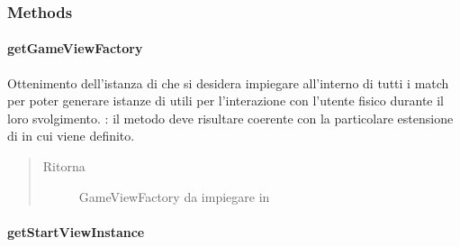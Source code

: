 \documentclass[letterpaper,10pt,italian,openany,oneside]{sphinxmanual}
\begin{document}
\begin{fulllineitems}
\label{\detokenize{source/it/unicam/cs/pa/mastermind/gamecore/MainManager:it.unicam.cs.pa.mastermind.gamecore.MainManager.MainManager()}}
\end{fulllineitems}



\subsubsection{Methods}
\label{\detokenize{source/it/unicam/cs/pa/mastermind/gamecore/MainManager:methods}}

\paragraph{getGameViewFactory}
\label{\detokenize{source/it/unicam/cs/pa/mastermind/gamecore/MainManager:getgameviewfactory}}

\begin{fulllineitems}
\label{\detokenize{source/it/unicam/cs/pa/mastermind/gamecore/MainManager:it.unicam.cs.pa.mastermind.gamecore.MainManager.getGameViewFactory()}}
Ottenimento dell’istanza di  che si desidera impiegare all’interno di tutti i match per poter generare istanze di  utili per l’interazione con l’utente fisico durante il loro svolgimento. : il metodo deve risultare coerente con la particolare estensione di  in cui viene definito.
\begin{quote}\begin{description}
\item[{Ritorna}] \leavevmode
GameViewFactory da impiegare in 

\end{description}\end{quote}

\end{fulllineitems}



\paragraph{getStartViewInstance}
\label{\detokenize{source/it/unicam/cs/pa/mastermind/gamecore/MainManager:getstartviewinstance}}
\end{document}
